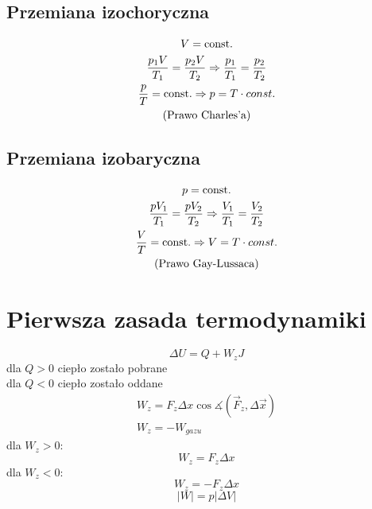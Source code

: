     \subsection{Przemiana izochoryczna}
      \begin{gather}
        V = \operatorname{const.}\\
        \frac{p_1V}{T_1} = \frac{p_2V}{T_2} \Rightarrow \frac{p_1}{T_1} = \frac{p_2}{T_2}\\
        \frac{p}{T} = \operatorname{const.} \Rightarrow p = T\cdot const.\\\text{(Prawo Charles'a)}
      \end{gather}
    \subsection{Przemiana izobaryczna}
      \begin{gather}
        p = \operatorname{const.}\\
        \frac{pV_1}{T_1} = \frac{pV_2}{T_2} \Rightarrow \frac{V_1}{T_1} = \frac{V_2}{T_2}\\
        \frac{V}{T} = \operatorname{const.} \Rightarrow V = T\cdot const.\\
        \text{(Prawo Gay-Lussaca)}
      \end{gather}
  \section{Pierwsza zasada termodynamiki}
    \begin{equation}
      \Delta U = Q + W_z \unit{J}
    \end{equation}
    dla $Q > 0$ ciepło zostało pobrane\\
    dla $Q < 0$ ciepło zostało oddane
    \begin{gather}
      W_z = F_z\Delta x\cos\measuredangle(\vec F_z, \Delta\vec x)\\
      W_z = -W_{gazu}
    \end{gather}
    dla $W_z > 0$:
    \begin{equation}
      W_z = F_z\Delta x
    \end{equation}
    dla $W_z < 0$:
    \begin{equation}
      W_z = -F_z\Delta x
    \end{equation}
    \begin{equation}
      |W| = p|\Delta V|
    \end{equation}
